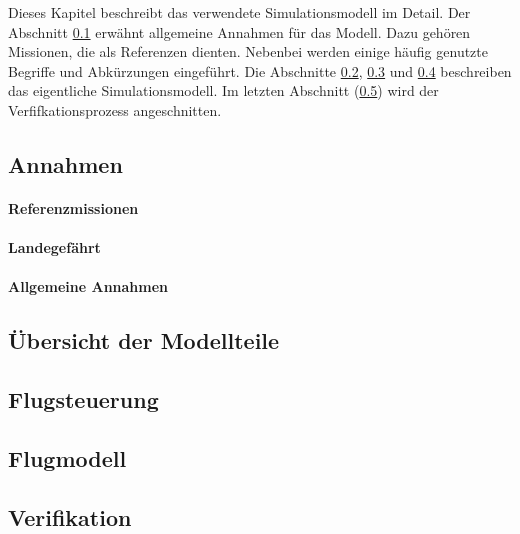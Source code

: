 Dieses Kapitel beschreibt das verwendete Simulationsmodell im Detail. Der Abschnitt \ref{subsec:assumptions} erwähnt allgemeine Annahmen für das Modell. Dazu gehören Missionen, die als Referenzen dienten. Nebenbei werden einige häufig genutzte Begriffe und Abkürzungen eingeführt. Die Abschnitte \ref{subsec:parts}, \ref{subsec:controller} und \ref{subsec:model} beschreiben das eigentliche Simulationsmodell. Im letzten Abschnitt (\ref{subsec:verification}) wird der Verfifkationsprozess angeschnitten.

\subsection{Annahmen}
\label{subsec:assumptions}
\paragraph{Referenzmissionen}


\paragraph{Landegefährt}


\paragraph{Allgemeine Annahmen}


\subsection{Übersicht der Modellteile}
\label{subsec:parts}

	
\subsection{Flugsteuerung}
\label{subsec:controller}

	
\subsection{Flugmodell}
\label{subsec:model}


\subsection{Verifikation}
\label{subsec:verification}
